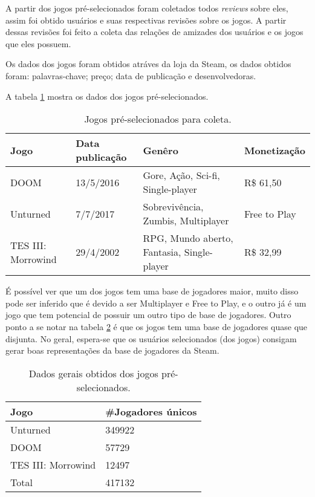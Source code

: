 \documentclass[12pt]{article}
\begin{document}
A partir dos jogos pré-selecionados foram coletados todos \textit{reviews} sobre eles, assim foi obtido usuários e suas respectivas revisões sobre os jogos. A partir dessas revisões foi feito a coleta das relações de amizades dos usuários e os jogos que eles possuem.

Os dados dos jogos foram obtidos atráves da loja da Steam, os dados obtidos foram: palavras-chave; preço; data de publicação e desenvolvedoras.

A tabela \ref{tab:preselection1} mostra os dados dos jogos pré-selecionados.

\begin{table}[ht]
\centering
\caption{Jogos pré-selecionados para coleta.}
\label{tab:preselection1}
				\scriptsize
\begin{tabular}{|l|l|l|l|}
				\hline
				Jogo & Data publicação & Genêro & Monetização \\\hline
				DOOM & 13/5/2016  & Gore, Ação, Sci-fi, Single-player & R\$ 61,50 \\\hline
				Unturned & 7/7/2017  & Sobrevivência, Zumbis, Multiplayer & Free to Play \\\hline
				TES III: Morrowind & 29/4/2002 & RPG, Mundo aberto, Fantasia, Single-player & R\$ 32,99  \\\hline
\end{tabular}
\end{table}

É possível ver que um dos jogos tem uma base de jogadores maior, muito disso pode ser inferido que é devido a ser Multiplayer e Free to Play, e o outro já é um jogo que tem potencial de possuir um outro tipo de base de jogadores. Outro ponto a se notar na tabela \ref{tab:datajogos} é que os jogos tem uma base de jogadores quase que disjunta. No geral, espera-se que os usuários selecionados (dos jogos) consigam gerar boas representações da base de jogadores da Steam.


\begin{table}[ht]
\centering
\caption{Dados gerais obtidos dos jogos pré-selecionados.}
\label{tab:datajogos}
\begin{tabular}{|l|l|}
				\hline
				Jogo     & \#Jogadores únicos  \\\hline
				Unturned & 349922 \\\hline
				DOOM     & 57729\\\hline
				TES III: Morrowind & 12497  \\\hline
				Total & 417132\\\hline
\end{tabular}
\end{table}
\end{document}
